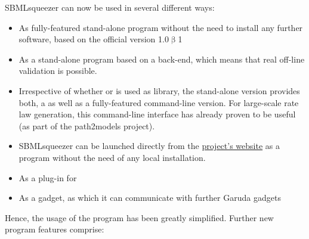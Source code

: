 SBMLsqueezer can now be used in several different ways:
\begin{itemize}
\item As fully-featured stand-alone program without the need to install any
      further software, based on the official \JSBML version  1.0$\upbeta$1
\item As a stand-alone program based on a \libSBML back-end, which means that
      real off-line \SBML validation is possible.
\item Irrespective of whether \JSBML or \libSBML is used as \SBML library, the
      stand-alone version provides both, a \GUI as well as
      a fully-featured command-line version. For large-scale rate law
      generation, this command-line interface has already proven to be useful
      (as part of the path2models project).
\item SBMLsqueezer can be launched directly from the
      \href{http://www.cogsys.cs.uni-tuebingen.de/software/SBMLsqueezer/}{project's website}
      as a \JavaWebStart program without the need of any local installation.
\item As a plug-in for 
\item As a \Garuda gadget, as which it can communicate with further Garuda
      gadgets
\end{itemize}
Hence, the usage of the program has been greatly simplified.
Further new program features comprise:
